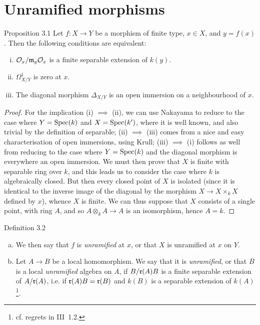 \section{Unramified morphisms}
\label{I.3}

\begin{itenv}{Proposition 3.1}
\label{I.3.1}
  Let $f\colon X\to Y$ be a morphism of finite type, $x\in X$, and $y=f(x)$.
  Then the following conditions are equivalent:
  \begin{enumerate}[(i)]
    \item $\cal{O}_x/\frak{m}_y\cal{O}_x$ is a finite separable extension of $k(y)$.
    \item $\Omega_{X/Y}^1$ is zero at $x$.
    \item The diagonal morphism $\Delta_{X/Y}$ is an open immersion on a neighbourhood of $x$.
  \end{enumerate}
\end{itenv}

\begin{proof}
  For the implication (i) $\implies$ (ii), we can use Nakayama to reduce to the case where $Y=\Spec(k)$ and $X=\Spec(k')$, where it is well known, and also trivial by the definition of separable;
  (ii) $\implies$ (iii) comes from a nice and easy characterisation of open immersions, using Krull;
  (iii) $\implies$ (i) follows as well from reducing to the case where $Y=\Spec(k)$ and the diagonal morphism is everywhere an open immersion.
  We must then prove that $X$ is finite with separable ring over $k$, and this leads us to consider the case where $k$ is algebraically closed.
  But then every closed point of $X$ is isolated (since it is identical to the inverse image of the diagonal by the morphism $X\to X\times_k X$ defined by $x$), whence $X$ is finite.
  We can thus suppose that $X$ consists of a single point, with ring $A$, and so $A\otimes_k A\to A$ is an isomorphism, hence $A=k$.
\end{proof}

\begin{rmenv}{Definition 3.2}
\label{I.3.2}
  \begin{enumerate}[(a)]
    \item We then say that $f$ is \emph{unramified} at $x$, or that $X$ is unramified at $x$ on $Y$.
    \item Let $A\to B$ be a local homomorphism.
      We say that it is \emph{unramified}, or that $B$ is a local \emph{unramified} algebra on $A$, if $B/\frak{r}(A)B$ is a finite separable extension of $A/\frak{r}(A)$, i.e. if $\frak{r}(A)B=\frak{r}(B)$ and $k(B)$ is a separable extension of $k(A)$\footnote{cf. regrets in III~1.2.}.
  \end{enumerate}
\end{rmenv}


